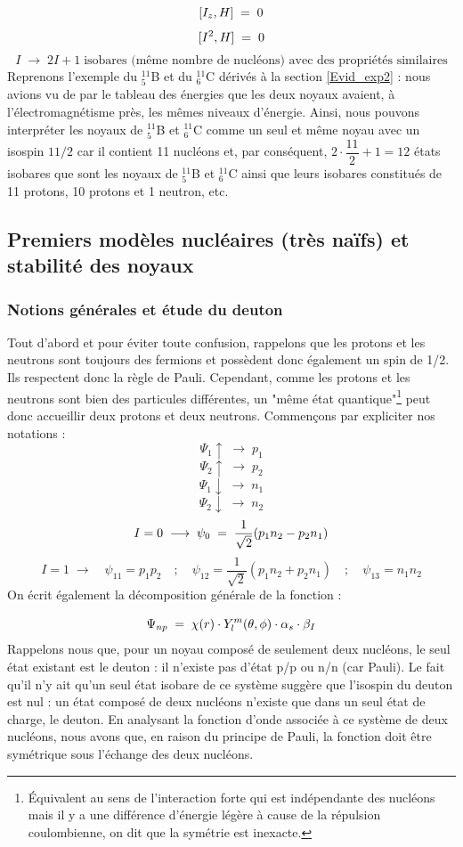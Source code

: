 \[
    [I_z,H] \; = \; 0
\]
\[
    [I^2,H] \; = \; 0
\]
\[
    I \; \longrightarrow\; 2I+1 \; \text{isobares (même nombre de nucléons) avec des propriétés similaires}
\]
Reprenons l'exemple du $^{11}_5$B et du $^{11}_6$C dérivés à la section \ref{Evid_exp2} : nous avions vu de par le tableau des énergies que les deux noyaux avaient, à l'électromagnétisme près, les mêmes niveaux d'énergie. Ainsi, nous pouvons interpréter les noyaux de $^{11}_5$B et $^{11}_6$C comme un seul et même noyau avec un isospin $11/2$ car il contient 11 nucléons et, par conséquent, $2\cdot\dfrac{11}{2}+1 = 12$ états isobares que sont les noyaux de $^{11}_5$B et $^{11}_6$C ainsi que leurs isobares constitués de 11 protons, 10 protons et 1 neutron, etc.




\subsection{Premiers modèles nucléaires (très naïfs) et stabilité des noyaux}
\subsubsection{Notions générales et étude du deuton}


Tout d'abord et pour éviter toute confusion, rappelons que les protons et les neutrons sont toujours des fermions et possèdent donc également un spin de 1/2. Ils respectent donc la règle de Pauli. Cependant, comme les protons et les neutrons sont bien des particules différentes, un "même état quantique"\footnote{Équivalent au sens de l'interaction forte qui est indépendante des nucléons mais il y a une différence d'énergie légère à cause de la répulsion coulombienne, on dit que la symétrie est inexacte.} peut donc accueillir deux protons et deux neutrons. Commençons par expliciter nos notations :
\[
    \Psi_1\uparrow \;\longrightarrow\; p_1
\]
\[
    \Psi_2\uparrow \;\longrightarrow\; p_2
\]
\[
    \Psi_1\downarrow\;\longrightarrow\; n_1
\]
\[
    \Psi_2\downarrow\;\longrightarrow\; n_2
\]
\[
    I = 0 \; \longrightarrow \; \psi_0 \; = \; \dfrac{1}{\sqrt{2}}(p_1n_2 - p_2n_1)
\]
\[
    I = 1 \; \longrightarrow \quad \psi_{11} = p_1p_2 \quad;\quad \psi_{12} = \dfrac{1}{\sqrt{2}}(p_1n_2 + p_2n_1) \quad;\quad \psi_{13} = n_1n_2
\]
On écrit également la décomposition générale de la fonction :

\[
    \Psi_{np} \; = \; \chi(r) \cdot Y_l^m(\theta,\phi) \cdot \alpha_s \cdot \beta_I
\]
Rappelons nous que, pour un noyau composé de seulement deux nucléons, le seul état existant est le deuton : il n'existe pas d'état p/p ou n/n (car Pauli). Le fait qu'il n'y ait qu'un seul état isobare de ce système suggère que l'isospin du deuton est nul : un état composé de deux nucléons n'existe que dans un seul état de charge, le deuton. En analysant la fonction d'onde associée à ce système de deux nucléons, nous avons que, en raison du principe de Pauli, la fonction doit être symétrique sous l'échange des deux nucléons.

